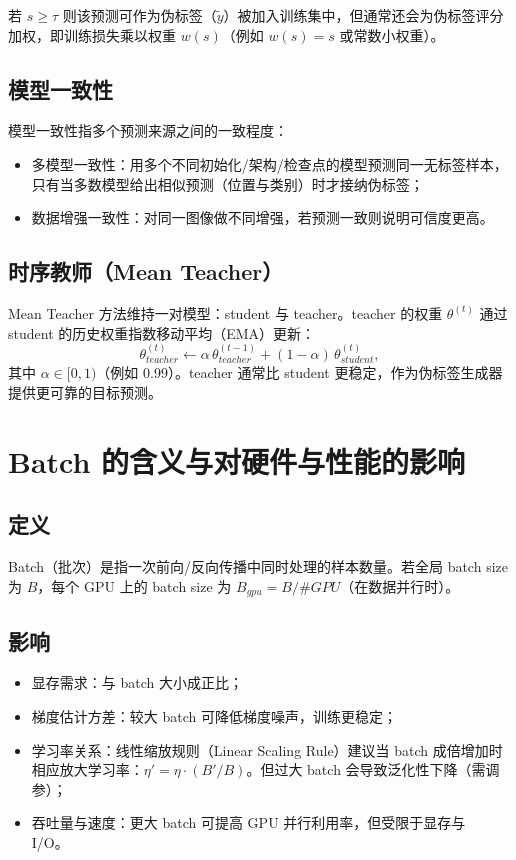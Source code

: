 \documentclass[11pt,a4paper]{article}
\begin{document}
若 $s\ge\tau$ 则该预测可作为伪标签（$\tilde y$）被加入训练集中，但通常还会为伪标签评分加权，即训练损失乘以权重 $w(s)$（例如 $w(s)=s$ 或常数小权重）。

\subsection*{模型一致性}
模型一致性指多个预测来源之间的一致程度：
\begin{itemize}
  \item 多模型一致性：用多个不同初始化/架构/检查点的模型预测同一无标签样本，只有当多数模型给出相似预测（位置与类别）时才接纳伪标签；
  \item 数据增强一致性：对同一图像做不同增强，若预测一致则说明可信度更高。
\end{itemize}

\subsection*{时序教师（Mean Teacher）}
Mean Teacher 方法维持一对模型：student 与 teacher。teacher 的权重 $\theta^{(t)}$ 通过 student 的历史权重指数移动平均（EMA）更新：
\[
\theta^{(t)}_{teacher} \leftarrow \alpha\,\theta^{(t-1)}_{teacher} + (1-\alpha)\,\theta^{(t)}_{student},
\]
其中 $\alpha\in[0,1)$（例如 0.99）。teacher 通常比 student 更稳定，作为伪标签生成器提供更可靠的目标预测。

\section{Batch 的含义与对硬件与性能的影响}
\subsection*{定义}
Batch（批次）是指一次前向/反向传播中同时处理的样本数量。若全局 batch size 为 $B$，每个 GPU 上的 batch size 为 $B_{gpu}=B/\#GPU$（在数据并行时）。

\subsection*{影响}
\begin{itemize}
  \item 显存需求：与 batch 大小成正比；\
  \item 梯度估计方差：较大 batch 可降低梯度噪声，训练更稳定；\
  \item 学习率关系：线性缩放规则（Linear Scaling Rule）建议当 batch 成倍增加时相应放大学习率：$\eta' = \eta \cdot (B'/B)$。但过大 batch 会导致泛化性下降（需调参）；\
  \item 吞吐量与速度：更大 batch 可提高 GPU 并行利用率，但受限于显存与 I/O。\
\end{itemize}
\end{document}
